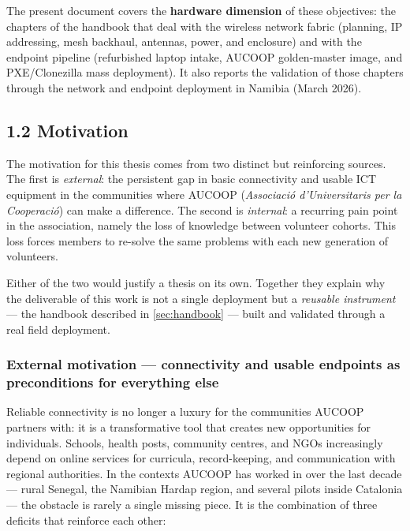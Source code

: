 The present document covers the \textbf{hardware dimension} of these
objectives: the chapters of the handbook that deal with the wireless
network fabric (planning, IP addressing, mesh backhaul, antennas, power,
and enclosure) and with the endpoint pipeline (refurbished laptop
intake, AUCOOP golden-master image, and PXE/Clonezilla mass deployment).
It also reports the validation of those chapters through the network and
endpoint deployment in Namibia (March 2026).

\hypertarget{motivation}{%
\subsection{1.2 Motivation}\label{motivation}}

The motivation for this thesis comes from two distinct but reinforcing
sources. The first is \emph{external}: the persistent gap in basic
connectivity and usable ICT equipment in the communities where AUCOOP
(\emph{Associació d'Universitaris per la Cooperació}) can make a
difference. The second is \emph{internal}: a recurring pain point in the
association, namely the loss of knowledge between volunteer cohorts.
This loss forces members to re-solve the same problems with each new
generation of volunteers.

Either of the two would justify a thesis on its own. Together they
explain why the deliverable of this work is not a single deployment but
a \emph{reusable instrument} --- the handbook described in
\autoref{sec:handbook} --- built and validated through a real field
deployment.

\hypertarget{external-motivation-connectivity-and-usable-endpoints-as-preconditions-for-everything-else}{%
\subsubsection{External motivation --- connectivity and usable endpoints
as preconditions for everything
else}\label{external-motivation-connectivity-and-usable-endpoints-as-preconditions-for-everything-else}}

Reliable connectivity is no longer a luxury for the communities AUCOOP
partners with: it is a transformative tool that creates new
opportunities for individuals. Schools, health posts, community centres,
and NGOs increasingly depend on online services for curricula,
record-keeping, and communication with regional authorities. In the
contexts AUCOOP has worked in over the last decade --- rural Senegal,
the Namibian Hardap region, and several pilots inside Catalonia --- the
obstacle is rarely a single missing piece. It is the combination of
three deficits that reinforce each other:

